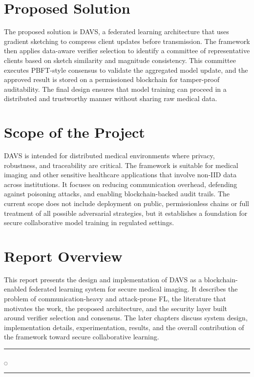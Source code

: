 \section{Proposed Solution}
The proposed solution is DAVS, a federated learning architecture that uses gradient sketching to compress client updates before transmission. The framework then applies data-aware verifier selection to identify a committee of representative clients based on sketch similarity and magnitude consistency. This committee executes PBFT-style consensus to validate the aggregated model update, and the approved result is stored on a permissioned blockchain for tamper-proof auditability. The final design ensures that model training can proceed in a distributed and trustworthy manner without sharing raw medical data.

\section{Scope of the Project}
DAVS is intended for distributed medical environments where privacy, robustness, and traceability are critical. The framework is suitable for medical imaging and other sensitive healthcare applications that involve non-IID data across institutions. It focuses on reducing communication overhead, defending against poisoning attacks, and enabling blockchain-backed audit trails. The current scope does not include deployment on public, permissionless chains or full treatment of all possible adversarial strategies, but it establishes a foundation for secure collaborative model training in regulated settings.

\section{Report Overview}
This report presents the design and implementation of DAVS as a blockchain-enabled federated learning system for secure medical imaging. It describes the problem of communication-heavy and attack-prone FL, the literature that motivates the work, the proposed architecture, and the security layer built around verifier selection and consensus. The later chapters discuss system design, implementation details, experimentation, results, and the overall contribution of the framework toward secure collaborative learning.

\rule{0.49\textwidth}{0.75pt} $_{\bigcirc}$ \rule{0.49\textwidth}{0.75pt}\\
